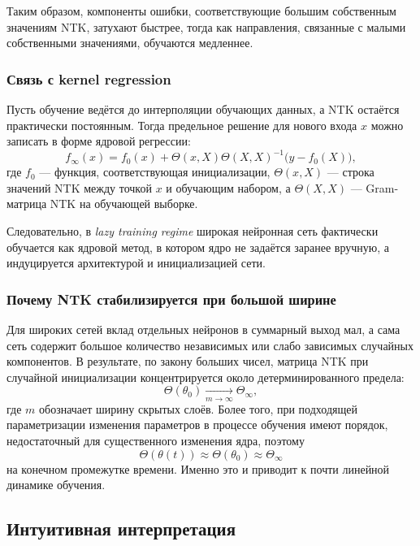 Таким образом, компоненты ошибки, соответствующие большим собственным значениям NTK, затухают быстрее, тогда как направления, связанные с малыми собственными значениями, обучаются медленнее.

\subsubsection{Связь с kernel regression}

Пусть обучение ведётся до интерполяции обучающих данных, а NTK остаётся практически постоянным. Тогда предельное решение для нового входа $x$ можно записать в форме ядровой регрессии:
\begin{equation}
    f_{\infty}(x)=f_0(x)+\Theta(x,X)\Theta(X,X)^{-1}\bigl(y-f_0(X)\bigr),
    \label{eq:kernel_regression_ntk}
\end{equation}
где $f_0$ --- функция, соответствующая инициализации, $\Theta(x,X)$ --- строка значений NTK между точкой $x$ и обучающим набором, а $\Theta(X,X)$ --- Gram-матрица NTK на обучающей выборке.

Следовательно, в \emph{lazy training regime} широкая нейронная сеть фактически обучается как ядровой метод, в котором ядро не задаётся заранее вручную, а индуцируется архитектурой и инициализацией сети.

\subsubsection{Почему NTK стабилизируется при большой ширине}

Для широких сетей вклад отдельных нейронов в суммарный выход мал, а сама сеть содержит большое количество независимых или слабо зависимых случайных компонентов. В результате, по закону больших чисел, матрица NTK при случайной инициализации концентрируется около детерминированного предела:
\begin{equation}
    \Theta(\theta_0) \xrightarrow[m\to\infty]{} \Theta_{\infty},
\end{equation}
где $m$ обозначает ширину скрытых слоёв. Более того, при подходящей параметризации изменения параметров в процессе обучения имеют порядок, недостаточный для существенного изменения ядра, поэтому
\begin{equation}
    \Theta(\theta(t)) \approx \Theta(\theta_0) \approx \Theta_{\infty}
\end{equation}
на конечном промежутке времени. Именно это и приводит к почти линейной динамике обучения.

\subsection{Интуитивная интерпретация}

